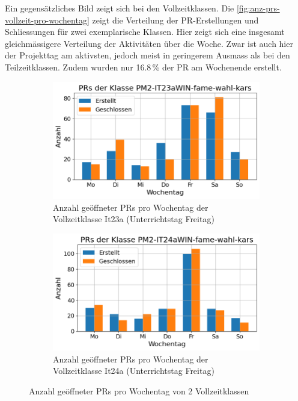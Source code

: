 Ein gegensätzliches Bild zeigt sich bei den Vollzeitklassen. Die \autoref{fig:anz-prs-vollzeit-pro-wochentag} zeigt die Verteilung der PR-Erstellungen und Schliessungen für zwei exemplarische Klassen.
Hier zeigt sich eine insgesamt gleichmässigere Verteilung der Aktivitäten über die Woche. Zwar ist auch hier der Projekttag am aktivsten, jedoch meist in geringerem Ausmass als bei den Teilzeitklassen. Zudem wurden nur 16.8\,\% der PR am Wochenende erstellt.

\begin{figure}[htbp]
    \centering
    \begin{subfigure}[b]{0.48\textwidth}
        \centering
        \includegraphics[width=\textwidth]{Figures/pr-klasse-per-wochentag-23a.png}
         \caption{Anzahl geöffneter PRs pro Wochentag der Vollzeitklasse It23a (Unterrichtstag Freitag)}
        \label{fig:anzahl-prs-pro-wochentag-it23a}
    \end{subfigure}
    \hfill
    \begin{subfigure}[b]{0.48\textwidth}
        \centering
        \includegraphics[width=\textwidth]{Figures/pr-klasse-per-wochentag-24a.png}
         \caption{Anzahl geöffneter PRs pro Wochentag der Vollzeitklasse It24a (Unterrichtstag Freitag)}
        \label{fig:anzahl-prs-pro-wochentag-it24a}
    \end{subfigure}
    \caption{Anzahl geöffneter PRs pro Wochentag von 2 Vollzeitklassen}
    \label{fig:anz-prs-vollzeit-pro-wochentag}
\end{figure}

